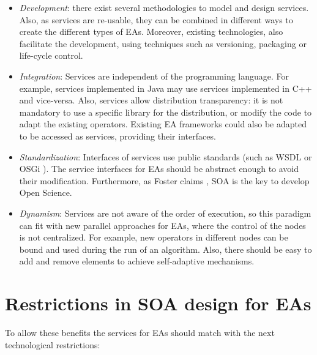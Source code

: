 \begin{itemize}
\item {\em Development}: there exist several methodologies to model and design services. Also, as services are re-usable, they can be combined in different ways to create the different types of EAs. Moreover, existing technologies, also facilitate the development, using techniques such as versioning, packaging or life-cycle control.
\item {\em Integration}: Services are independent of the programming language. For example, services implemented in Java may use services implemented in C++ and vice-versa. Also, services allow distribution transparency: it is not mandatory to use a specific library for the distribution, or modify the code to adapt the existing operators. Existing EA frameworks could also be adapted to be accessed as services, providing their interfaces. 
\item {\em Standardization}: Interfaces of services use public
  standards (such as WSDL \cite{WSDL} or OSGi \cite{OSGI}). The
  service interfaces for EAs should be abstract enough to avoid their
  modification. Furthermore, as Foster claims
  \cite{Foster2005Science}, SOA is the key to develop Open Science. 
\item {\em Dynamism}: Services are not aware of the order of execution, so this paradigm can fit with new parallel approaches for EAs, where the control of the nodes is not centralized. For example, new operators in different nodes can be bound and used during the run of an algorithm. Also, there should be easy to add and remove elements to achieve self-adaptive mechanisms.
\end{itemize} 










\section{Restrictions in SOA design for EAs}
\label{sec:soa:restrictions}
To allow these benefits the services for EAs should match with the next technological
restrictions: %

